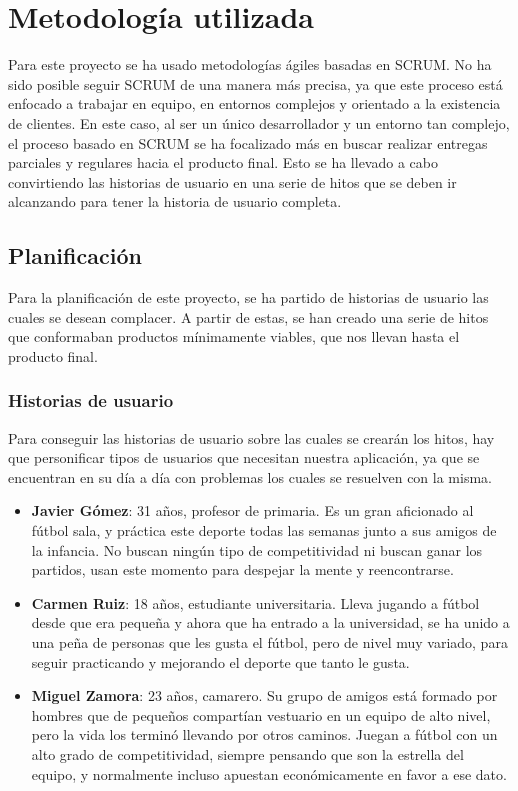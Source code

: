 \chapter{Metodología utilizada}

Para este proyecto se ha usado metodologías ágiles basadas en SCRUM. No ha sido posible seguir SCRUM de una manera más precisa, ya que este proceso está enfocado a trabajar en
equipo, en entornos complejos y orientado a la existencia de clientes. En este caso, al ser un único desarrollador y un entorno tan complejo, el proceso basado en SCRUM se ha
focalizado más en buscar realizar entregas parciales y regulares hacia el producto final. Esto se ha llevado a cabo convirtiendo las historias de usuario en una serie de hitos
que se deben ir alcanzando para tener la historia de usuario completa.\\

\section{Planificación}

Para la planificación de este proyecto, se ha partido de historias de usuario las cuales se desean complacer. A partir de estas, se han creado una serie de hitos que conformaban productos mínimamente viables,
 que nos llevan hasta el producto final.

\subsection{Historias de usuario}

Para conseguir las historias de usuario sobre las cuales se crearán los hitos, hay que personificar tipos de usuarios que necesitan nuestra aplicación, ya que se encuentran en su día a día
con problemas los cuales se resuelven con la misma.

\newpage

\begin{itemize}
    \item \textbf{Javier Gómez}: 31 años, profesor de primaria. Es un gran aficionado al fútbol sala, y práctica este deporte todas las semanas junto a sus amigos de la infancia. No buscan ningún tipo de competitividad ni buscan ganar los partidos, usan este momento para despejar la mente y reencontrarse.
    \item \textbf{Carmen Ruiz}: 18 años, estudiante universitaria. Lleva jugando a fútbol desde que era pequeña y ahora que ha entrado a la universidad, se ha unido a una peña de personas que les gusta el fútbol, pero de nivel muy variado, para seguir practicando y mejorando el deporte que tanto le gusta.
    \item \textbf{Miguel Zamora}: 23 años, camarero. Su grupo de amigos está formado por hombres que de pequeños compartían vestuario en un equipo de alto nivel, pero la vida los terminó llevando por otros caminos. Juegan a fútbol con un alto grado de competitividad, siempre pensando que son la estrella del equipo, y normalmente incluso apuestan económicamente en favor a ese dato.
\end{itemize}


